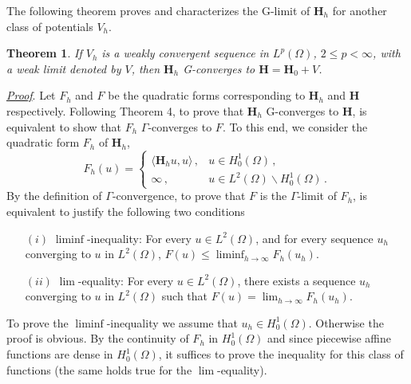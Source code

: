 \documentclass[11pt, epsf]{amsart}
\newtheorem{Theo}{Theorem}
\begin{document}
The following theorem proves and characterizes the G-limit of $\mathbf{H}_h$ for another class of potentials $V_h$.
\begin{Theo}
\emph{
If $V_h$ is a weakly convergent sequence in $L^p(\Omega)$, $2\leq p<\infty$, with a weak limit denoted by $V$, then $\mathbf{H}_h$ G-converges to $\mathbf{H}=\mathbf{H}_0+V$.
}
\end{Theo}
\hspace{-4mm}\underline{\emph{Proof}}. Let $F_h$ and $F$ be the quadratic forms corresponding to $\mathbf{H}_h$ and $\mathbf{H}$ respectively. Following Theorem 4, to prove that $\mathbf{H}_h$ G-converges to $\mathbf{H}$, is equivalent to show that $F_h$ $\Gamma$-converges to $F$. To this end, we consider the quadratic form $F_h$ of $\mathbf{H}_h$,
\begin{equation*}
F_h(u)=\left\{ \begin{array}{ll}
\langle \mathbf{H}_hu,u\rangle\,,& u\in H^1_0(\Omega) \, , \\
\infty\,,& u\in L^2(\Omega)\backslash H^1_0(\Omega)\, .
\end{array} \right.
\end{equation*}
By the definition of $\Gamma$-convergence, to prove that $F$ is the $\Gamma$-limit of $F_h$, is equivalent to justify the following two conditions
\begin{itemize}
\item [$(i)$] $\liminf$-inequality: For every $u\in L^2(\Omega)$, and for every sequence $u_h$ converging to $u$ in $L^2(\Omega)$, $F(u)\leq\displaystyle\liminf_{h\to\infty} F_h(u_h)$.
\item [$(ii)$] $\lim$-equality: For every $u\in L^2(\Omega)$, there exists a sequence $u_h$ converging to $u$ in $L^2(\Omega)$ such that
    $F(u)=\displaystyle\lim_{h\to\infty} F_h(u_h)$.
\end{itemize}
To prove the $\liminf$-inequality we assume that $u_h\in H^1_0(\Omega)$. Otherwise the proof is obvious. By the continuity of $F_h$ in $H^1_0(\Omega)$ and since piecewise affine functions are dense in $H^1_0(\Omega)$, it suffices to prove the inequality for this class of functions (the same holds true for the $\lim$-equality).
\end{document}
